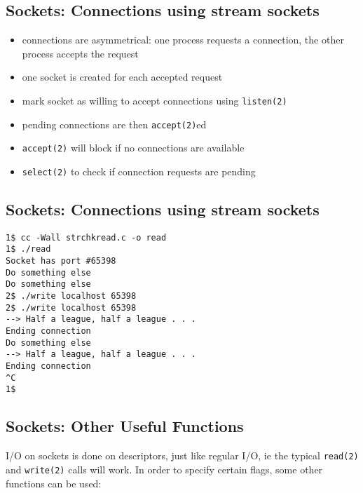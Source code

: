 \documentclass[xga]{xdvislides}
\begin{document}
\subsection{Sockets: Connections using stream sockets}
\begin{itemize}
	\item connections are asymmetrical:  one process requests a connection,
		the other process accepts the request
	\item one socket is created for each accepted request
	\item mark socket as willing to accept connections using {\tt listen(2)}
	\item pending connections are then {\tt accept(2)}ed
	\item {\tt accept(2)} will block if no connections are available
	\item {\tt select(2)} to check if connection requests are pending
\end{itemize}

\subsection{Sockets: Connections using stream sockets}
\begin{verbatim}
1$ cc -Wall strchkread.c -o read
1$ ./read
Socket has port #65398
Do something else
Do something else
2$ ./write localhost 65398
2$ ./write localhost 65398
‐-> Half a league, half a league . . .
Ending connection
Do something else
--> Half a league, half a league . . .
Ending connection
^C
1$
\end{verbatim}
\vfill


\subsection{Sockets: Other Useful Functions}

I/O on sockets is done on descriptors, just like regular I/O, ie the typical
{\tt read(2)} and {\tt write(2)} calls will work.  In order to specify certain
flags, some other functions can be used:
\end{document}
